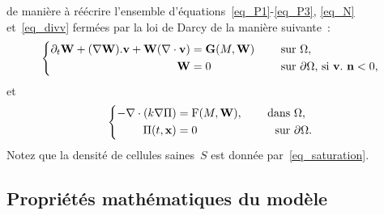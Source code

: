 \documentclass[main.tex]{subfiles}
\begin{document}
de manière à réécrire l'ensemble d'équations~\eqref{eq_P1}-\eqref{eq_P3}, \eqref{eq_N} et~\eqref{eq_divv} fermées par la loi de Darcy de la manière suivante~:
\begin{equation}\label{eq_transport_pop}
\left\{
\begin{aligned}
\partial_t {\bf W} + (\nabla {\bf W}).\mathbf{v} + {\bf W} (\nabla\cdot \mathbf{v}) &= {\bf G}(M,{\bf W}) & \quad \textrm{ sur } & \Omega, \\
{\bf W} &=0 & \quad \textrm{ sur } & \partial \Omega \textrm{, si } \mathbf{v}.\ {\bf n}<0 ,
\end{aligned}
\right.
\end{equation}
et
\begin{equation}
\left\{ \begin{aligned}
 \label{eq_pression}
 -\nabla\cdot\left(k\nabla \Pi\right) &={\rm F}(M,{\bf W}), &\quad \textrm{ dans } & \Omega , \\
    \Pi(t,\mathbf{x}) &=0 & \quad \textrm{ sur  }& \partial \Omega.
\end{aligned}
\right. \end{equation}
Notez que la densité de cellules saines~$S$ est donnée par~\eqref{eq_saturation}.


\subsection{Propriétés mathématiques du modèle}
\end{document}
